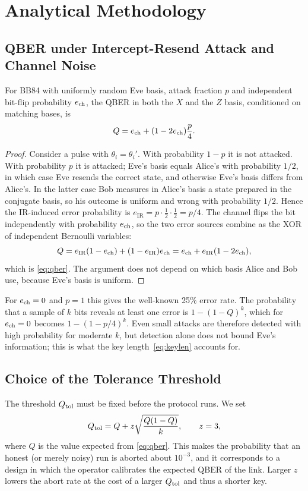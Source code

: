 \section{Analytical Methodology}\label{sec:analysis}

\subsection{QBER under Intercept-Resend Attack and Channel Noise}

\begin{lemma}\label{lem:qber}
For BB84 with uniformly random Eve basis, attack fraction $p$ and independent bit-flip probability $e_{\mathrm{ch}}$, the QBER in both the $X$ and the $Z$ basis, conditioned on matching bases, is
\begin{equation}\label{eq:qber}
Q=e_{\mathrm{ch}}+(1-2e_{\mathrm{ch}})\frac p4 .
\end{equation}
\end{lemma}
\begin{proof}
Consider a pulse with $\theta_i=\theta_i'$. With probability $1-p$ it is not attacked. With probability $p$ it is attacked; Eve's basis equals Alice's with probability $1/2$, in which case Eve resends the correct state, and otherwise Eve's basis differs from Alice's. In the latter case Bob measures in Alice's basis a state prepared in the conjugate basis, so his outcome is uniform and wrong with probability $1/2$. Hence the IR-induced error probability is $e_{\mathrm{IR}}=p\cdot\frac12\cdot\frac12=p/4$. The channel flips the bit independently with probability $e_{\mathrm{ch}}$, so the two error sources combine as the XOR of independent Bernoulli variables:
\[
Q=e_{\mathrm{IR}}(1-e_{\mathrm{ch}})+(1-e_{\mathrm{IR}})e_{\mathrm{ch}}=e_{\mathrm{ch}}+e_{\mathrm{IR}}(1-2e_{\mathrm{ch}}),
\]
which is \eqref{eq:qber}. The argument does not depend on which basis Alice and Bob use, because Eve's basis is uniform.
\end{proof}

For $e_{\mathrm{ch}}=0$ and $p=1$ this gives the well-known 25\% error rate. The probability that a sample of $k$ bits reveals at least one error is $1-(1-Q)^k$, which for $e_{\mathrm{ch}}=0$ becomes $1-(1-p/4)^k$. Even small attacks are therefore detected with high probability for moderate $k$, but detection alone does not bound Eve's information; this is what the key length~\eqref{eq:keylen} accounts for.

\subsection{Choice of the Tolerance Threshold}
The threshold $Q_{\mathrm{tol}}$ must be fixed before the protocol runs. We set
\begin{equation}\label{eq:qtol}
Q_{\mathrm{tol}}=Q+z\sqrt{\frac{Q(1-Q)}{k}},\qquad z=3,
\end{equation}
where $Q$ is the value expected from \eqref{eq:qber}. This makes the probability that an honest (or merely noisy) run is aborted about $10^{-3}$, and it corresponds to a design in which the operator calibrates the expected QBER of the link. Larger $z$ lowers the abort rate at the cost of a larger $Q_{\mathrm{tol}}$ and thus a shorter key.

